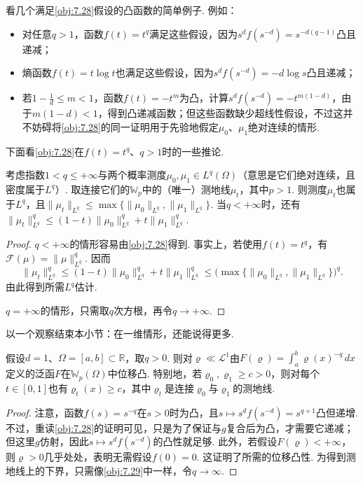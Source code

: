 看几个满足\autoref{obj:7.28}假设的凸函数的简单例子. 例如：
\begin{itemize}
 \item 对任意$q>1$，函数$f(t)=t^q$满足这些假设，因为$s^df(s^{-d})=s^{-d(q-1)}$凸且递减；
 \item {}\label{idx:i51-p274}
熵函数$f(t)=t\log t$也满足这些假设，因为$s^df(s^{-d})=-d\log s$凸且递减；
 \item 若$1-\frac1d\leq m<1$，函数$f(t)=-t^m$为凸，计算$s^df(s^{-d})=-t^{m(1-d)}$，由于$m(1-d)<1$，得到凸递减函数；但这些函数缺少超线性假设，不过这并不妨碍将\autoref{obj:7.28}的同一证明用于先验地假定$\mu_0$、$\mu_1$绝对连续的情形.
\end{itemize}
下面看\autoref{obj:7.28}在$f(t)=t^q$、$q>1$时的一些推论.
\begin{proposition}\label{obj:7.29}
考虑指数$1<q\leq+\infty$与两个概率测度$\mu_0,\mu_1\in L^q(\Omega)$（意思是它们绝对连续，且密度属于$L^q$）. 取连接它们的$\mathbb W_p$中的（唯一）测地线$\mu_t$，其中$p>1$. 则测度$\mu_t$也属于$L^q$，且$\|\mu_t\|_{L^q}\leq\max\{\|\mu_0\|_{L^q},\|\mu_1\|_{L^q}\}$. 当$q<+\infty$时，还有$\|\mu_t\|_{L^q}^q\leq(1-t)\|\mu_0\|_{L^q}^q+t\|\mu_1\|_{L^q}^q$.
\end{proposition}
\begin{proof}
$q<+\infty$的情形容易由\autoref{obj:7.28}得到. 事实上，若使用$f(t)=t^q$，有$\mathscr F(\mu)=\|\mu\|_{L^q}^q$. 因而
\[
 \|\mu_t\|_{L^q}^q\leq(1-t)\|\mu_0\|_{L^q}^q+t\|\mu_1\|_{L^q}^q
 \leq\bigl(\max\{\|\mu_0\|_{L^q},\|\mu_1\|_{L^q}\}\bigr)^q.
\]
由此得到所需$L^q$估计.

$q=+\infty$的情形，只需取$q$次方根，再令$q\to+\infty$.
\end{proof}

以一个观察结束本小节：在一维情形，还能说得更多.
\begin{proposition}\label{obj:7.30}
假设$d=1$、$\Omega=[a,b]\subset\mathbb R$，取$q>0$. 则对$\varrho\ll\mathscr L^1$由$F(\varrho)=\int_a^b\varrho(x)^{-q}\,dx$定义的泛函$F$在$\mathbb W_p(\Omega)$中位移凸. 特别地，若$\varrho_0,\varrho_1\geq c>0$，则对每个$t\in[0,1]$也有$\varrho_t(x)\geq c$，其中$\varrho_t$是连接$\varrho_0$与$\varrho_1$的测地线.
\end{proposition}
\begin{proof}
注意，函数$f(s)=s^{-q}$在$s>0$时为凸，且$s\mapsto s^df(s^{-d})=s^{q+1}$凸但递增. 不过，重读\autoref{obj:7.28}的证明可见，只是为了保证与$g$复合后为凸，才需要它递减；但这里$g$仿射，因此$s\mapsto s^df(s^{-d})$的凸性就足够. 此外，若假设$F(\varrho)<+\infty$，则$\varrho>0$几乎处处，表明无需假设$f(0)=0$. 这证明了所需的位移凸性. 为得到测地线上的下界，只需像\autoref{obj:7.29}中一样，令$q\to\infty$.
\end{proof}

